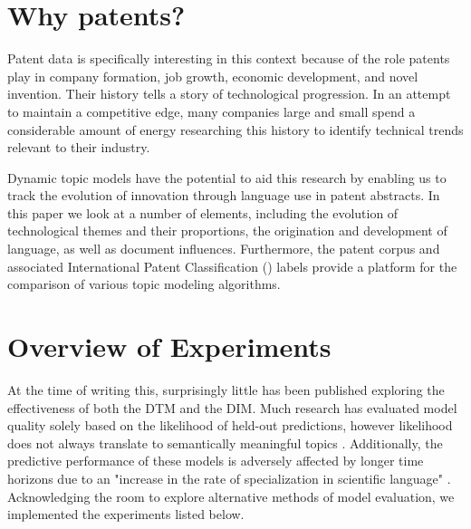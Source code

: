 \section{Why patents?}
Patent data is specifically interesting in this context because of the role patents play in company formation, job growth, economic development, and novel invention. Their history tells a story of technological progression. In an attempt to maintain a competitive edge, many companies large and small spend a considerable amount of energy researching this history to identify technical trends relevant to their industry. 

Dynamic topic models have the potential to aid this research by enabling us to track the evolution of innovation through language use in patent abstracts. In this paper we look at a number of elements, including the evolution of technological themes and their proportions, the origination and development of language, as well as document influences. Furthermore, the patent corpus and associated International Patent Classification () labels provide a platform for the comparison of various topic modeling algorithms.


\section{Overview of Experiments}

At the time of writing this, surprisingly little has been published exploring the effectiveness of both the DTM and the DIM. Much research has evaluated model quality solely based on the likelihood of held-out predictions, however likelihood does not always translate to semantically meaningful topics \parencite{Chang:Boyd-Graber:Wang:Gerrish:Blei-2009}. Additionally, the predictive performance of these models is adversely affected by longer time horizons due to an "increase in the rate of specialization in scientific language" \parencite{Blei:2006:DTM:1143844.1143859}. Acknowledging the room to explore alternative methods of model evaluation, we implemented the experiments listed below. 


